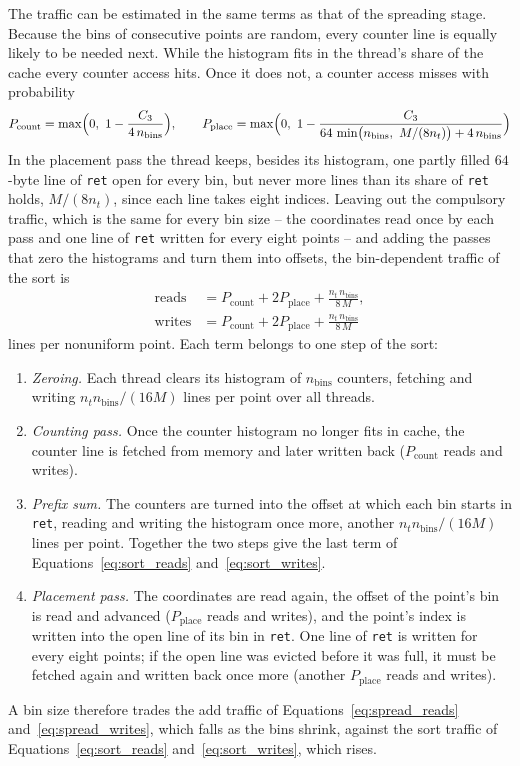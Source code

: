 The traffic can be estimated in the same terms as that of the spreading stage. Because the bins of consecutive points are random, every counter line is equally likely to be needed next. While the histogram fits in the thread's share of the cache every counter access hits. Once it does not, a counter access misses with probability
\begin{equation}
    P_{\mathrm{count}} = \max\Bigl(0,\ 1 - \frac{C_3}{4\,n_{\mathrm{bins}}}\Bigr), \qquad
    P_{\mathrm{place}} = \max\Bigl(0,\ 1 - \frac{C_3}{64\,\min\bigl(n_{\mathrm{bins}},\ M/(8 n_t)\bigr) + 4\,n_{\mathrm{bins}}}\Bigr)
    \label{eq:sort_counts_miss}
\end{equation}
In the placement pass the thread keeps, besides its histogram, one partly filled $64$-byte line of \texttt{ret} open for every bin, but never more lines than its share of \texttt{ret} holds, $M/(8 n_t)$, since each line takes eight indices.
Leaving out the compulsory traffic, which is the same for every bin size -- the coordinates read once by each pass and one line of \texttt{ret} written for every eight points -- and adding the passes that zero the histograms and turn them into offsets, the bin-dependent traffic of the sort is
\begin{align}
    \mathrm{reads}  &= P_{\mathrm{count}} + 2 P_{\mathrm{place}} + \frac{n_t\, n_{\mathrm{bins}}}{8\,M}, \label{eq:sort_reads}\\
    \mathrm{writes} &= P_{\mathrm{count}} + 2 P_{\mathrm{place}} + \frac{n_t\, n_{\mathrm{bins}}}{8\,M}\label{eq:sort_writes}
\end{align}
lines per nonuniform point. Each term belongs to one step of the sort:
\begin{enumerate}
    \item \emph{Zeroing.} Each thread clears its histogram of $n_{\mathrm{bins}}$ counters, fetching and writing $n_t n_{\mathrm{bins}}/(16 M)$ lines per point over all threads.
    \item \emph{Counting pass.} Once the counter histogram no longer fits in cache, the counter line is fetched from memory and later written back ($P_{\mathrm{count}}$ reads and writes).
    \item \emph{Prefix sum.} The counters are turned into the offset at which each bin starts in \texttt{ret}, reading and writing the histogram once more, another $n_t n_{\mathrm{bins}}/(16 M)$ lines per point. Together the two steps give the last term of Equations~\eqref{eq:sort_reads} and~\eqref{eq:sort_writes}.
    \item \emph{Placement pass.} The coordinates are read again, the offset of the point's bin is read and advanced ($P_{\mathrm{place}}$ reads and writes), and the point's index is written into the open line of its bin in \texttt{ret}. One line of \texttt{ret} is written for every eight points; if the open line was evicted before it was full, it must be fetched again and written back once more (another $P_{\mathrm{place}}$ reads and writes).
\end{enumerate}
A bin size therefore trades the add traffic of Equations~\eqref{eq:spread_reads} and~\eqref{eq:spread_writes}, which falls as the bins shrink, against the sort traffic of Equations~\eqref{eq:sort_reads} and~\eqref{eq:sort_writes}, which rises.

